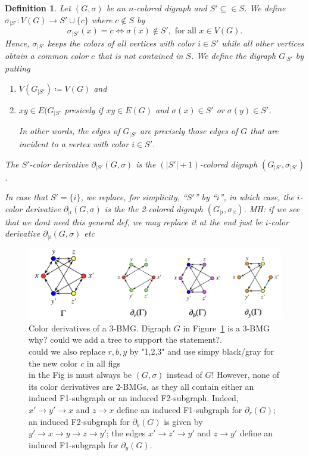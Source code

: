 \documentclass[final,3p,times]{elsarticle}
\newtheorem{definition}{Definition}[section]
\newcommand{\TODO}[1]{\begingroup\color{red}#1\endgroup}
\newcommand{\mh}[1]{\begingroup\color{blue}#1\endgroup}
\begin{document}
\begin{definition}
\label{def:color-derivative}
\mh{Let $(G,\sigma)$ be an $n$-colored digraph and $S'\subseteq \in S$. We
    define $\sigma_{|S'}\colon V(G) \to S'\cup \{c\}$ where $c\notin S$ by
    \[\sigma_{|S'}(x)=c \iff \sigma(x)\notin S', \text{ for all } x\in
    V(G).\] Hence, $\sigma_{|S'}$ keeps the colors of all vertices with
    color $i\in S'$ while all other vertices obtain a common color $c$ that is
    not contained in $S$. We define the digraph $G_{|S'}$ by putting
\begin{enumerate}
    \item $V(G_{|S'}) \coloneqq V(G)$ and
    
    \item $xy\in E(G_{|S'}$  presicely if $xy\in E(G)$ and 
    	  $\sigma(x)\in S'$ or  $\sigma(y)\in S'$.
    	  
    	  In other words, the edges of $G_{|S'}$ are precisely those edges 
    	  of $G$ that are incident to a vertex with color $i\in S'$.
\end{enumerate}
%
	The \emph{$S'$-color derivative} $\partial_{|S'}(G,\sigma)$ is the
	$(|S'|+1)$-colored digraph $(G_{|S'},\sigma_{|S'})$. 
	
	
	In case that $S' = \{i\}$, we replace, for simplicity, ``$S'$'' by ``$i$'',
	in which case, the $i$-color derivative $\partial_{|i}(G,\sigma)$ is
	the the 2-colored digraph $(G_{|i},\sigma_{|i})$.
}
\TODO{\small MH: if we see that we dont need this general def, we may replace it at the end 
just be $i$-color derivative $\partial_{|i}(G,\sigma)$ etc }
\end{definition} 

\begin{figure}[ht]
  \centering
    \includegraphics[width=16cm]{figures/color_derivatives.png}
    \caption{Color derivatives of a 3-BMG.
    Digraph $G$ in Figure~\ref{fig:color_derivatives} is a 3-BMG
    \TODO{why? could we add a tree to support the statement?}.\\
    \TODO{could we also replace $r,b,y$ by "1,2,3" and use simpy black/gray
    for the new color $c$ in all figs}\\
    \TODO{in the Fig is must always be $(G,\sigma)$ instead of $G$!}
     However,
    none of its color derivatives are 2-BMGs, as they all contain either an
    induced F1-subgraph or an induced F2-subgraph. Indeed, $x'\rightarrow
    y'\rightarrow x$ and $z\rightarrow x$ define an induced F1-subgraph for
    $\partial_r(G)$; an induced F2-subgraph for $\partial_b(G)$ is
    given by $y'\rightarrow x\rightarrow y\rightarrow z\rightarrow y'$; the
    edges $x'\rightarrow z'\rightarrow y'$ and $z \rightarrow y'$ define an
    induced F1-subgraph for $\partial_y(G)$.
}
   \label{fig:color_derivatives}
\end{figure}
\end{document}
